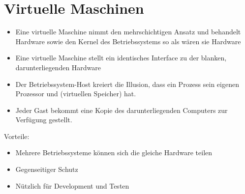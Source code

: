 \documentclass[a4paper]{scrreprt}
\begin{document}
\section{Virtuelle Maschinen}
	\begin{itemize}
		\item Eine virtuelle Maschine nimmt den mehrschichtigen Ansatz und behandelt Hardware sowie den Kernel des Betriebssystems so als wären sie Hardware
		\item Eine virtuelle Maschine stellt ein identisches Interface zu der blanken, darunterliegenden Hardware
		\item Der Betriebssystem-Host kreiert die Illusion, dass ein Prozess sein eigenen Prozessor und (virtuellen Speicher) hat.
		\item Jeder Gast bekommt eine Kopie des darunterliegenden Computers zur Verfügung gestellt.
	\end{itemize}
	Vorteile:
		\begin{itemize}
			\item Mehrere Betriebssysteme können sich die gleiche Hardware teilen
			\item Gegenseitiger Schutz
			\item Nützlich für Development und Testen
		\end{itemize}
\end{document}
